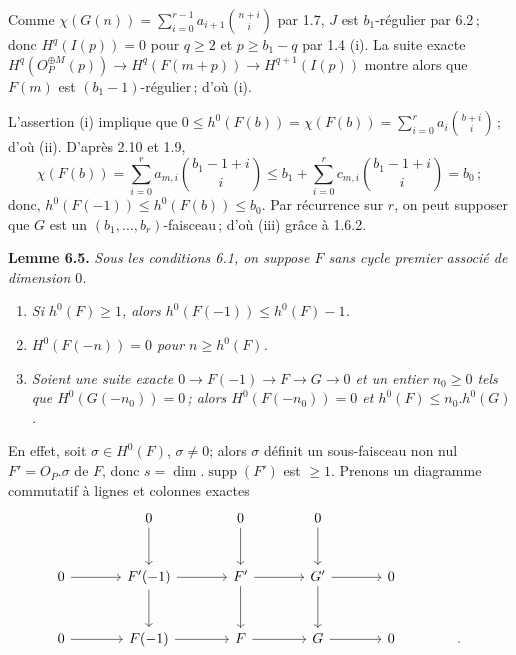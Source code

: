 
Comme \(\chi(G(n))=\sum_{i=0}^{r-1} a_{i+1}\binom{n+i}{i}\) par 1.7, $J$ est $b_1$-r\'egulier par 6.2\,; donc \(H^q(I(p))=0\) pour $q\ge2$ et $p\ge b_1-q$ par 1.4 (i). La suite exacte \(H^q({O}_P^{\oplus M}(p))\longrightarrow H^q(F(m+p))\longrightarrow H^{q+1}(I(p))\) montre alors que $F(m)$ est $(b_1-1)$-r\'egulier\,; d'o\`u (i).

L'assertion (i) implique que \(0\le h^0(F(b))=\chi(F(b))=\sum_{i=0}^{r}a_i\binom{b+i}{i}\)\,; d'o\`u (ii). D'apr\`es 2.10 et 1.9,
\[
   \chi(F(b))=\sum_{i=0}^{r} a_{m,i}\binom{b_1-1+i}{i}\le b_1+\sum_{i=0}^{r} c_{m,i}\binom{b_1-1+i}{i}=b_0\,;
\]
donc, $h^0(F(-1))\le h^0(F(b))\le b_0$. Par r\'ecurrence sur $r$, on peut supposer que $G$ est un $(b_1,\ldots,b_r)$-faisceau\,; d'o\`u (iii) gr\^ace \`a 1.6.2.

\textbf{Lemme 6.5.} \emph{Sous les conditions 6.1, on suppose $F$ sans cycle premier associ\'e de dimension $0$.}
\begin{enumerate}[label=(\roman*)]
\item \emph{Si $h^0(F)\ge1$, alors $h^0(F(-1))\le h^0(F)-1$.}
\item \emph{$H^0(F(-n))=0$ pour $n\ge h^0(F)$.}
\item \emph{Soient une suite exacte $0\to F(-1)\to F\to G\to0$ et un entier $n_0\ge0$ tels que $H^0(G(-n_0))=0$\,; alors $H^0(F(-n_0))=0$ et $h^0(F)\le n_0.h^0(G)$.}
\end{enumerate}
En effet, soit $\sigma\in H^0(F)$, $\sigma\ne0$; alors $\sigma$ d\'efinit un sous-faisceau non nul $F'={O}_P.\sigma$ de $F$, donc $s=\dim.\operatorname{supp}(F')$ est $\ge1$. Prenons un diagramme commutatif \`a lignes et colonnes exactes
\[
\begin{tikzcd}[column sep=large,row sep=large]
&0 \arrow[d]&0 \arrow[d]&0 \arrow[d]&\\
0 \arrow[r]&F'(-1) \arrow[r] \arrow[d]&F' \arrow[r] \arrow[d]&G' \arrow[r] \arrow[d]&0\\
0 \arrow[r]&F(-1) \arrow[r]&F \arrow[r]&G \arrow[r]&0 & .
\end{tikzcd}
\]
